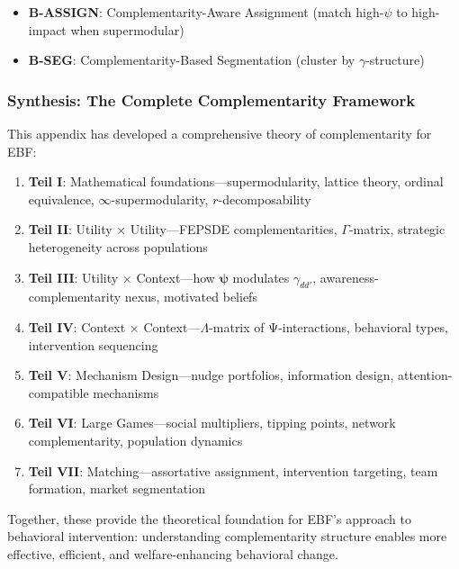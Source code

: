 \begin{itemize}
    \item \textbf{B-ASSIGN}: Complementarity-Aware Assignment (match high-$\psi$ to 
    high-impact when supermodular)
    \item \textbf{B-SEG}: Complementarity-Based Segmentation (cluster by $\gamma$-structure)
\end{itemize}

\subsubsection{Synthesis: The Complete Complementarity Framework}

This appendix has developed a comprehensive theory of complementarity for EBF:

\begin{enumerate}
    \item \textbf{Teil I}: Mathematical foundations---supermodularity, lattice theory, 
    ordinal equivalence, $\infty$-supermodularity, $r$-decomposability
    
    \item \textbf{Teil II}: Utility × Utility---FEPSDE complementarities, $\Gamma$-matrix, 
    strategic heterogeneity across populations
    
    \item \textbf{Teil III}: Utility × Context---how $\boldsymbol{\psi}$ modulates 
    $\gamma_{dd'}$, awareness-complementarity nexus, motivated beliefs
    
    \item \textbf{Teil IV}: Context × Context---$\Lambda$-matrix of Ψ-interactions, 
    behavioral types, intervention sequencing
    
    \item \textbf{Teil V}: Mechanism Design---nudge portfolios, information design, 
    attention-compatible mechanisms
    
    \item \textbf{Teil VI}: Large Games---social multipliers, tipping points, 
    network complementarity, population dynamics
    
    \item \textbf{Teil VII}: Matching---assortative assignment, intervention targeting, 
    team formation, market segmentation
\end{enumerate}

Together, these provide the theoretical foundation for EBF's approach to 
behavioral intervention: understanding complementarity structure enables more 
effective, efficient, and welfare-enhancing behavioral change.




